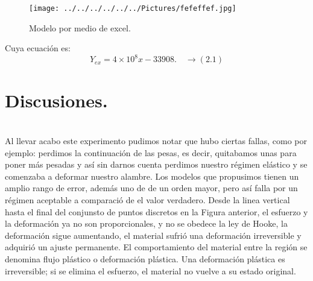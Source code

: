 \documentclass[10pt,a4paper]{article}
\begin{document}
\begin{figure}[hbtp]
 \centering
 \texttt{[image: ../../../../../../Pictures/fefeffef.jpg]} 
 \caption{Modelo por medio de excel. }
\end{figure} 
 Cuya ecuaci\'{o}n es:
 \[{ Y }_{ ex}= 4\times { 10 }^{ 8 }x - 33908. \quad \rightarrow(2.1) \]
 
 \section*{Discusiones.}\\
 Al llevar acabo este experimento pudimos notar que hubo ciertas fallas, como por ejemplo: perdimos la continuaci\'{o}n de las pesas, es decir, quitabamos unas para poner m\'{a}s pesadas y as\'{i} sin darnos cuenta perdimos nuestro r\'{e}gimen el\'{a}stico y se comenzaba a deformar nuestro alambre. Los modelos que propusimos tienen un amplio rango de error, adem\'{a}s uno de de un orden mayor, pero as\'{i} falla por un r\'{e}gimen aceptable a comparaci\'{o} de el valor verdadero. Desde la linea vertical hasta el final del conjunsto de puntos discretos en la Figura anterior, el esfuerzo y la deformaci\'{o}n ya no son proporcionales, y no se obedece la ley de Hooke, la deformaci\'{o}n sigue aumentando, el material sufri\'{o} una deformaci\'{o}n irreversible y adquiri\'{o} un ajuste permanente. El comportamiento del material entre la regi\'{o}n se denomina flujo pl\'{a}stico o deformaci\'{o}n pl\'{a}stica. Una deformaci\'{o}n pl\'{a}stica es irreversible; si se elimina el esfuerzo, el material no vuelve a su estado original. 
 
\end{document}
